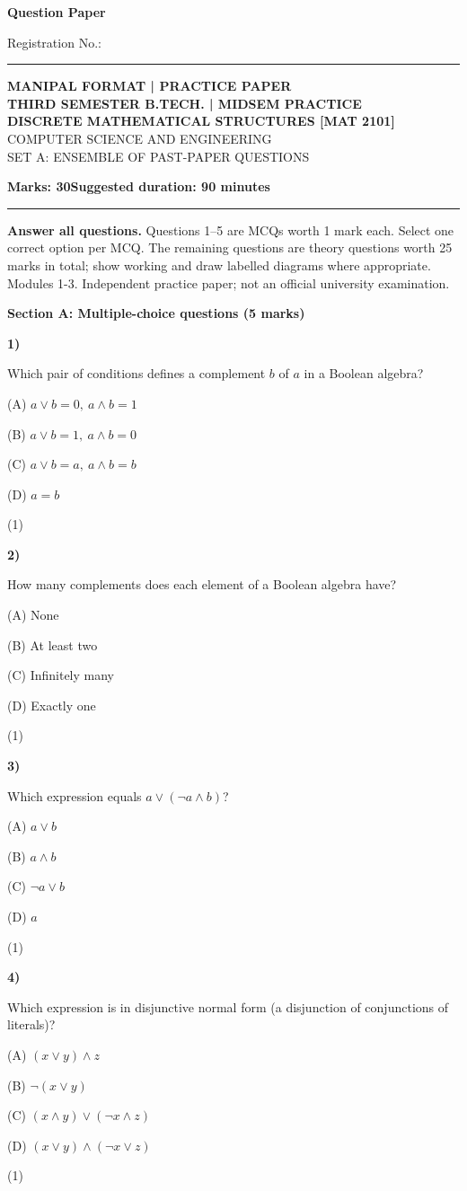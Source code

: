 \documentclass[11pt,a4paper]{article}
\newcommand{\question}[3]{\par\vspace{8pt}\noindent\begin{minipage}[t]{0.075\linewidth}\textbf{#1)}\end{minipage}\begin{minipage}[t]{0.855\linewidth}#3\end{minipage}\hfill\begin{minipage}[t]{0.055\linewidth}\raggedleft(#2)\end{minipage}\par}
\begin{document}
{\LARGE\bfseries Question Paper}\hfill {\small Registration No.: \rule{33mm}{0.3pt}}\par\vspace{8pt}
\begin{center}{\large\bfseries MANIPAL FORMAT | PRACTICE PAPER}\\[6pt]{\bfseries THIRD SEMESTER B.TECH. | MIDSEM PRACTICE}\\[4pt]{\bfseries DISCRETE MATHEMATICAL STRUCTURES [MAT 2101]}\\[4pt]{\small COMPUTER SCIENCE AND ENGINEERING}\\[3pt]{\small SET A: ENSEMBLE OF PAST-PAPER QUESTIONS}\end{center}
\textbf{Marks: 30}\hfill\textbf{Suggested duration: 90 minutes}\par\vspace{3pt}\hrule\vspace{5pt}
{\small\textbf{Answer all questions.} Questions 1--5 are MCQs worth 1 mark each. Select one correct option per MCQ. The remaining questions are theory questions worth 25 marks in total; show working and draw labelled diagrams where appropriate. Modules 1-3. Independent practice paper; not an official university examination.}\par
\medskip\textbf{Section A: Multiple-choice questions (5 marks)}\par
\question{1}{1}{Which pair of conditions defines a complement $b$ of $a$ in a Boolean algebra?\par (A) $a\lor b=0,\ a\land b=1$\par (B) $a\lor b=1,\ a\land b=0$\par (C) $a\lor b=a,\ a\land b=b$\par (D) $a=b$}
\question{2}{1}{How many complements does each element of a Boolean algebra have?\par (A) None\par (B) At least two\par (C) Infinitely many\par (D) Exactly one}
\question{3}{1}{Which expression equals $a\lor(\neg a\land b)$?\par (A) $a\lor b$\par (B) $a\land b$\par (C) $\neg a\lor b$\par (D) $a$}
\question{4}{1}{Which expression is in disjunctive normal form (a disjunction of conjunctions of literals)?\par (A) $(x\lor y)\land z$\par (B) $\neg(x\lor y)$\par (C) $(x\land y)\lor(\neg x\land z)$\par (D) $(x\lor y)\land(\neg x\lor z)$}
\end{document}
